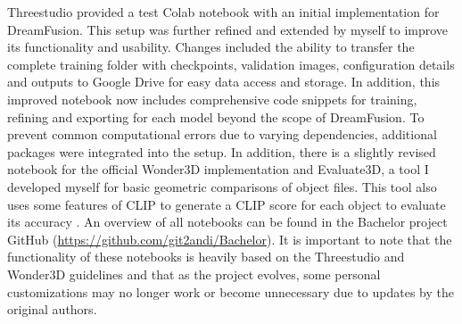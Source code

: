 Threestudio provided a test Colab notebook with an initial implementation for DreamFusion. This setup was further refined and extended by myself to improve its functionality and usability. Changes included the ability to transfer the complete training folder with checkpoints, validation images, configuration details and outputs to Google Drive for easy data access and storage. In addition, this improved notebook now includes comprehensive code snippets for training, refining and exporting for each model beyond the scope of DreamFusion. To prevent common computational errors due to varying dependencies, additional packages were integrated into the setup.  
In addition, there is a slightly revised notebook for the official Wonder3D implementation \citep{long2023wonder3d} and Evaluate3D, a tool I developed myself for basic geometric comparisons of object files. This tool also uses some features of CLIP to generate a CLIP score for each object to evaluate its accuracy \citep{radfordCLIP}. 
An overview of all notebooks can be found in the Bachelor project GitHub (\url{https://github.com/git2andi/Bachelor}). It is important to note that the functionality of these notebooks is heavily based on the Threestudio and Wonder3D guidelines and that as the project evolves, some personal customizations may no longer work or become unnecessary due to updates by the original authors.